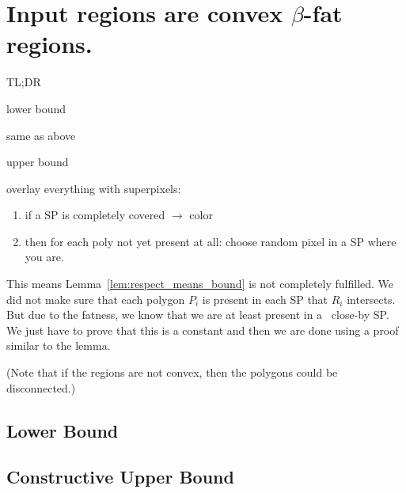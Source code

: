 \documentclass[a4paper,UKenglish,cleveref]{lipics-v2019}
\begin{document}

\label{sub:points_algo}







\section{Input regions are convex $\beta$-fat regions.}
\label{sec:fat}
TL;DR

lower bound

same as above

upper bound

overlay everything with superpixels:
\begin{enumerate}
	\item if a SP is completely covered $\rightarrow$ color
	\item then for each poly not yet present at all: choose random pixel in a SP where you are.
\end{enumerate}
This means Lemma~\ref{lem:respect_means_bound} is not completely fulfilled. We did not make sure that each polygon $P_i$ is present in each SP that $R_i$ intersects. But due to the fatness, we know that we are at least present in a ~close-by SP. We just have to prove that this is a constant and then we are done using a proof similar to the lemma.


(Note that if the regions are not convex, then the polygons could be disconnected.)


\subsection{Lower Bound}
\label{sub:fat_lower}




\subsection{Constructive Upper Bound}
\label{sub:fat_upper}
\end{document}
